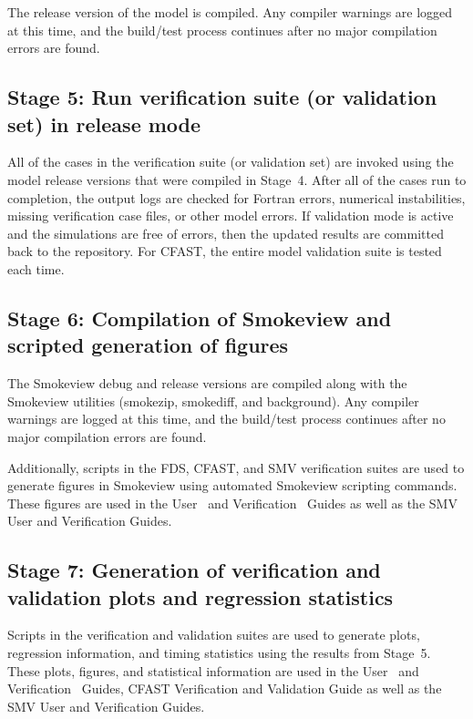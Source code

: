 \documentclass[11pt]{book}
\begin{document}
The release version of the model is compiled. Any compiler warnings are logged at this time, and the build/test process continues after no major compilation errors are found.

\subsection*{Stage 5: Run verification suite (or validation set) in release mode}

All of the cases in the verification suite (or validation set) are invoked using the model release versions that were compiled in Stage~4. After all of the cases run to completion, the output logs are checked for Fortran errors, numerical instabilities, missing verification case files, or other model errors. If validation mode is active and the simulations are free of errors, then the updated results are committed back to the repository. For CFAST, the entire model validation suite is tested each time.

\subsection*{Stage 6: Compilation of Smokeview and scripted generation of figures}

The Smokeview debug and release versions are compiled along with the Smokeview utilities (smokezip, smokediff, and background). Any compiler warnings are logged at this time, and the build/test process continues after no major compilation errors are found.

Additionally, scripts in the FDS, CFAST, and SMV verification suites are used to generate figures in Smokeview using automated Smokeview scripting commands. These figures are used in the User~\cite{FDS_Users_Guide} \cite{CFAST_Users_Guide_7} and Verification~\cite{FDS_Verification_Guide} Guides as well as the SMV User and Verification Guides.

\subsection*{Stage 7: Generation of verification and validation plots and regression statistics}

Scripts in the verification and validation suites are used to generate plots, regression information, and timing statistics using the results from Stage~5. These plots, figures, and statistical information are used in the  User~\cite{FDS_Users_Guide} \cite{CFAST_Users_Guide_7} and Verification~\cite{FDS_Verification_Guide} Guides, CFAST Verification and Validation Guide \cite{CFAST_Valid_Guide_7} as well as the SMV User and Verification Guides.
\end{document}
